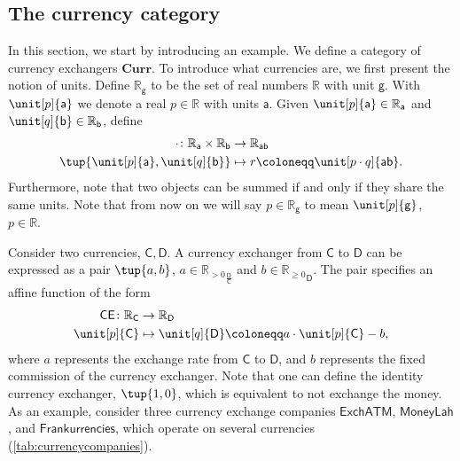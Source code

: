 \begin{remark}
\subsection{The currency category}
In this section, we start by introducing an example. We define a category of currency exchangers $\mathbf{Curr}$. To introduce what currencies are, we first present the notion of units. Define $\mathbb{R}_\mathsf{g}$ to be the set of real numbers $\mathbb{R}$ with unit $\mathsf{g}$. With $\unit[p]{\mathsf{a}}$ we denote a real $p\in \mathbb{R}$ with units $\mathsf{a}$. Given $\unit[p]{\mathsf{a}} \in \mathbb{R}_\mathsf{a}$ and $\unit[q]{\mathsf{b}}\in \mathbb{R}_\mathsf{b}$, define
    \begin{equation}
    \begin{aligned}
    \cdot \colon \mathbb{R}_\mathsf{a} \times \mathbb{R}_\mathsf{b} &\to \mathbb{R}_\mathsf{ab}\\
    \tup{\unit[p]{\mathsf{a}},\unit[q]{\mathsf{b}}}&\mapsto r\coloneqq \unit[p\cdot q]{\mathsf{ab}}.
    \end{aligned}
    \end{equation}
Furthermore, note that two objects can be summed if and only if they share the same units. Note that from now on we will say $p\in \mathbb{R}_\mathsf{g}$ to mean $\unit[p]{\mathsf{g}}$, $p\in \mathbb{R}$.

\noindent Consider two currencies, $\mathsf{C,D}$. A currency exchanger from $\mathsf{C}$ to $\mathsf{D}$ can be expressed as a pair $\tup{a,b}$, $a\in {\mathbb{R}_{>0}}_ {\frac{\mathsf{D}}{\mathsf{C}}}$ and $b\in {\mathbb{R}_{\geq 0}}_ {\mathsf{D}}$. The pair specifies an affine function of the form
\begin{equation}
        \begin{aligned}
        \mathsf{CE}\colon \mathbb{R}_\mathsf{C}&\to \mathbb{R}_\mathsf{D}\\
        \unit[p]{\mathsf{C}}&\mapsto \unit[q]{\mathsf{D}} \coloneqq a\cdot \unit[p]{\mathsf{C}} -b,
        \end{aligned}
    \end{equation}
   where $a$ represents the exchange rate from $\mathsf{C}$ to $\mathsf{D}$, and $b$ represents the fixed commission of the currency exchanger. Note that one can define the identity currency exchanger, $\tup{1,0}$, which is equivalent to not exchange the money. As an example, consider three currency exchange companies $\mathsf{ExchATM}$, $\mathsf{MoneyLah}$, and $\mathsf{Frankurrencies}$, which operate on several currencies (\cref{tab:currencycompanies}).
   

\end{remark}
